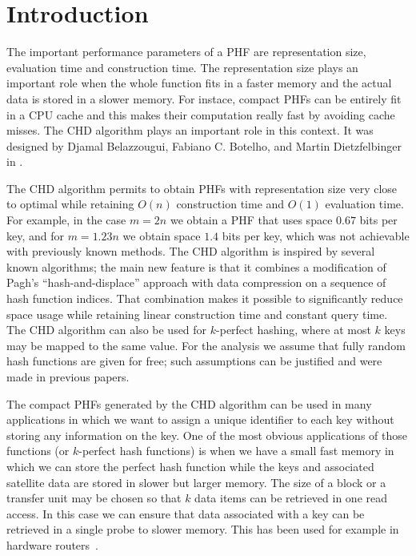 \section{Introduction} \label{sec:introduction}


The important performance parameters of a PHF are representation size, evaluation time and construction time. The representation size plays an important role when the whole function fits in a faster memory and the actual data is stored in a slower memory. For instace, compact PHFs can be entirely fit in a CPU cache and this makes their computation really fast by avoiding cache misses. The CHD algorithm plays an important role in this context. It was designed by Djamal Belazzougui, Fabiano C. Botelho, and Martin Dietzfelbinger in \cite{bbd09}.


The CHD algorithm permits to obtain PHFs with representation size very close to optimal while retaining $O(n)$ construction time and $O(1)$ evaluation time. For example, in the case $m=2n$ we obtain a PHF that uses space $0.67$ bits per key, and for $m=1.23n$ we obtain space $1.4$ bits per key, which was not achievable with previously known methods. The CHD algorithm is inspired by several known algorithms; 
the main new feature is that it combines a modification of Pagh's ``hash-and-displace'' approach
with data compression on a sequence of hash function indices. 
That combination makes it possible to significantly reduce space usage 
while retaining linear construction time and constant query time. 
The CHD algorithm can also be used for $k$-perfect hashing,
where at most $k$ keys may be mapped to the same value.
For the analysis we assume that fully random hash functions are given for free;
such assumptions can be justified and were made in previous papers.

The compact PHFs generated by the CHD algorithm can be used in many applications in which we want to assign a unique identifier to each key without storing any information on the key. One of the most obvious applications of those functions 
(or $k$-perfect hash functions) is when we have a small fast memory in which we can store the perfect hash function while the keys and associated satellite data are stored in slower but larger memory. 
The size of a block or a transfer unit may be chosen so that $k$ data items can be retrieved in
one read access. In this case we can ensure that data associated with a key can be retrieved in a single probe to slower memory. This has been used for example in hardware routers~\cite{pb06}. 


